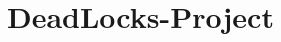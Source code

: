 \chapter{Dead\+Locks-\/\+Project}
\hypertarget{md__r_e_a_d_m_e}{}\label{md__r_e_a_d_m_e}
\label{md__r_e_a_d_m_e_autotoc_md0}%
%
